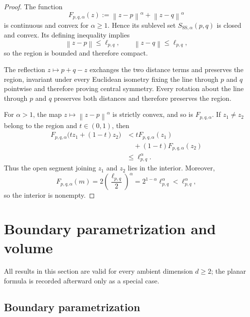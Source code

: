 \documentclass[a4paper,fleqn]{cas-dc}
\theoremstyle{definition}
\theoremstyle{remark}
\newcommand{\norm}[1]{\left\lVert #1\right\rVert}
\newcommand{\ellpq}{\ell_{p,q}}
\newcommand{\0}{\mathbf{0}}
\begin{document}
\begin{proof}
The function
\begin{equation}
    F_{p,q,\alpha}(z)
    :=\norm{z-p}^{\alpha}+\norm{z-q}^{\alpha}
\end{equation}
is continuous and convex for $\alpha\geq1$. Hence its sublevel set
$S_{\mathrm{SS},\alpha}(p,q)$ is closed and convex. Its defining inequality
implies
\begin{equation}
    \norm{z-p}\leq\ellpq,
    \qquad
    \norm{z-q}\leq\ellpq,
\end{equation}
so the region is bounded and therefore compact.

The reflection $z\mapsto p+q-z$ exchanges the two distance terms and preserves
the region, invariant under every Euclidean isometry fixing the line through
$p$ and $q$ pointwise and therefore proving central symmetry.
Every rotation about the line through
$p$ and $q$ preserves both distances and therefore preserves the region.

For $\alpha>1$, the map $z\mapsto\norm{z-p}^{\alpha}$ is strictly convex, and
so is $F_{p,q,\alpha}$. If $z_1\neq z_2$ belong to the region and
$t\in(0,1)$, then
\begin{equation}
\begin{aligned}
F_{p,q,\alpha}\bigl(tz_1+(1-t)z_2\bigr)
&<
tF_{p,q,\alpha}(z_1)
\\
&\quad
+(1-t)F_{p,q,\alpha}(z_2)
\\
&\leq \ellpq^\alpha.
\end{aligned}
\end{equation}
Thus the open segment joining $z_1$ and $z_2$ lies in the interior. Moreover,
\begin{equation}
    F_{p,q,\alpha}(m)
    =2\left(\frac{\ellpq}{2}\right)^{\alpha}
    =2^{1-\alpha}\ellpq^{\alpha}
    <\ellpq^{\alpha},
\end{equation}
so the interior is nonempty.
\end{proof}


\section{Boundary parametrization and volume}
\label{sec:boundary-volume}

All results in this section are valid for every ambient dimension $d\geq2$;
the planar formula is recorded afterward only as a special case.

\subsection{Boundary parametrization}
\end{document}
